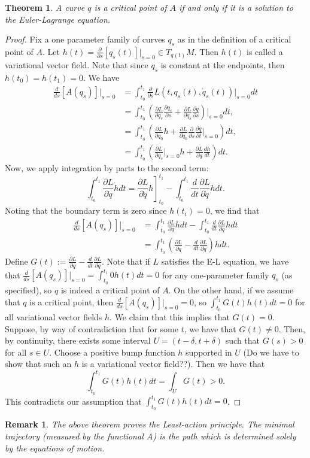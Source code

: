 \documentclass{article}
\newcommand{\de}{\delta}
\newcommand{\pd}[1]{\frac{\partial}{\partial #1}}
\newcommand{\pdof}[2]{\frac{\partial #1}{\partial #2}}
\newtheorem{thm}{Theorem}
\newtheorem{rmk}{Remark}
\begin{document}
\begin{thm}
    A curve $q$ is a critical point of $A$ if and only if it is a solution to the Euler-Lagrange equation.
\end{thm}
\begin{proof}
    Fix a one parameter family of curves $q_s$ as in the definition of a critical point of $A$. Let $h(t) = \pd{s}[q_s(t)]\big|_{s=0}\in T_{q(t)}M$. Then $h(t)$ is called a variational vector field. Note that since $q_s$ is constant at the endpoints, then $h(t_0)=h(t_1) = 0$. We have
    \begin{align*}
        \frac{d}{ds}[A(q_s)]\Big|_{s=0} &= \int_{t_0}^{t_1}\pd{s}L(t,q_s(t),\dot q_s(t))\big|_{s=0}dt\\
        &=\int_{t_0}^{t_1}\left(\pdof{L}{q_s}\pdof{q_s}{s}+\pdof{L}{\dot q_s}\pdof{\dot q}{s}\right)\bigg|_{s=0}dt,\\
        &=\int_{t_0}^{t_1}\left(\pdof{L}{q_0}h+\pdof{L}{\dot q_0}\pd{s}\pdof{q}{t}\bigg|_{s=0}\right)dt,\\
        &=\int_{t_0}^{t_1}\left(\pdof{L}{q_s}\bigg|_{s=0}h+\pdof{L}{\dot q}\frac{dh}{dt}\right)dt.
    \end{align*}
    Now, we apply integration by parts to the second term:
    \[\int_{t_0}^{t_1}\pdof{L}{\dot q}\dot h dt = \left.\pdof{L}{\dot q}h\right]_{t_0}^{t_1}-\int_{t_0}^{t_1}\frac{d}{dt}\pdof{L}{\dot q}h dt.\]
    Noting that the boundary term is zero since $h(t_i) = 0$, we find that
    \begin{align*}
        \frac{d}{ds}[A(q_s)]\Big|_{s=0}&=\int_{t_0}^{t_1}\pdof{L}{q}hdt-\int_{t_0}^{t_1}\frac{d}{dt}\pdof{L}{\dot q}h dt\\
        &=\int_{t_0}^{t_1}\left(\pdof{L}{q}-\frac{d}{dt}\pdof{L}{\dot q}\right)h dt.
    \end{align*}
    Define $G(t) := \pdof{L}{q}-\frac{d}{dt}\pdof{L}{\dot q}$. Note that if $L$ satisfies the E-L equation, we have that $\frac{d}{ds}[A(q_s)]\Big|_{s=0} = \int_{t_0}^{t_1}0h(t)dt = 0$ for any one-parameter family $q_s$ (as specified), so $q$ is indeed a critical point of $A$. On the other hand, if we assume that $q$ is a critical point, then $\frac{d}{ds}[A(q_s)]\Big|_{s=0}=0$, so $\int_{t_0}^{t_1}G(t)h(t) dt = 0$ for all variational vector fields $h$. We claim that this implies that $G(t)=0 $. Suppose, by way of contradiction that for some $t$, we have that $G(t)\neq 0$. Then, by continuity, there exists some interval $U=(t-\de,t+\de)$ such that $G(s)>0$ for all $s\in U$. Choose a positive bump function $h$  supported in $U$ (Do we have to show that such an $h$ is a variational vector field??). Then we have that
    \[\int_{t_0}^{t_1} G(t)h(t)dt = \int_UG(t) >0.\]
    This contradicts our assumption that $\int_{t_0}^{t_1} G(t)h(t)dt = 0$.
\end{proof}
\begin{rmk}
    The above theorem proves the Least-action principle. The minimal trajectory (measured by the functional $A$) is the path which is determined solely by the equations of motion.
\end{rmk}
\end{document}
